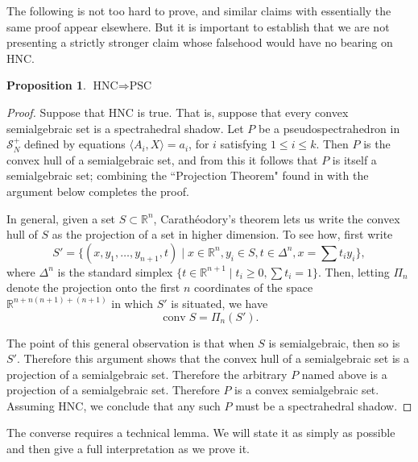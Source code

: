 \documentclass[11pt]{article} %
\newtheorem{prop}[thm]{Proposition}
\newcommand{\R}{\mathbb{R}}
\newcommand{\s}{\mathcal{S}}
\DeclareMathOperator{\conv}{conv}
\begin{document}
The following is not too hard to prove, and similar claims with essentially the same proof appear elsewhere. But it is important to establish that we are not presenting a strictly stronger claim whose falsehood would have no bearing on HNC. 

\begin{prop}
$\text{HNC} \Rightarrow \text{PSC}$
\label{HNCPNC}
\end{prop}

\begin{proof}
Suppose that HNC is true. That is, suppose that every convex semialgebraic set is a spectrahedral shadow. Let $P$ be a pseudospectrahedron in $\s_N^+$ defined by equations $\langle A_i, X \rangle = a_i$, for $i$ satisfying $1\leq i \leq k$. Then $P$ is the convex hull of a semialgebraic set, and from this it follows that $P$ is itself a semialgebraic set; combining the ``Projection Theorem" found in \cite{PRSTL} with the argument below completes the proof.

In general, given a set $S \subset \R^n$, Carath\'eodory's theorem lets us write the convex hull of $S$ as the projection of a set in higher dimension. To see how, first write
\[S' = \{(x,y_1,\ldots,y_{n+1},t) \mid x \in \R^n,y_i \in S, t \in \Delta^n, x= \sum t_iy_i \}, \]
where $\Delta^n$ is the standard simplex $\{t \in \R^{n+1}\mid t_i \geq 0, \sum t_i = 1\}$. Then, letting $\Pi_n$ denote the projection onto the first $n$  coordinates of the space $\R^{n+n(n+1)+(n+1)}$ in which $S'$ is situated, we have
\[\conv S        = \Pi_n(S').\]

The point of this general observation is that when $S$ is semialgebraic, then so is $S'$. Therefore this argument shows that the convex hull of a semialgebraic set is a projection of a semialgebraic set. Therefore the arbitrary $P$ named above is a projection of a semialgebraic set. Therefore $P$ is a convex semialgebraic set. Assuming HNC, we conclude that any such $P$ must be a spectrahedral shadow.
\end{proof}

The converse requires a technical lemma. We will state it as simply as possible and then give a full interpretation as we prove it.
\end{document}
